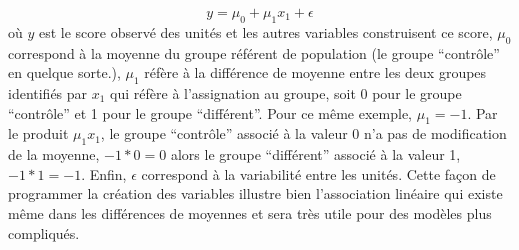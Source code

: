 \documentclass[
]{book}
\begin{document}
\[y = \mu_0 + \mu_1x_1 + \epsilon\]
où \(y\) est le score observé des unités et les autres variables construisent ce score, \(\mu_0\) correspond à la moyenne du groupe référent de population (le groupe ``contrôle'' en quelque sorte.), \(\mu_1\) réfère à la différence de moyenne entre les deux groupes identifiés par \(x_1\) qui réfère à l'assignation au groupe, soit 0 pour le groupe ``contrôle'' et 1 pour le groupe ``différent''. Pour ce même exemple, \(\mu_1 = -1\). Par le produit \(\mu_1x_1\), le groupe ``contrôle'' associé à la valeur 0 n'a pas de modification de la moyenne, \(-1*0=0\) alors le groupe ``différent'' associé à la valeur 1, \(-1*1=-1\). Enfin, \(\epsilon\) correspond à la variabilité entre les unités. Cette façon de programmer la création des variables illustre bien l'association linéaire qui existe même dans les différences de moyennes et sera très utile pour des modèles plus compliqués.
\end{document}
